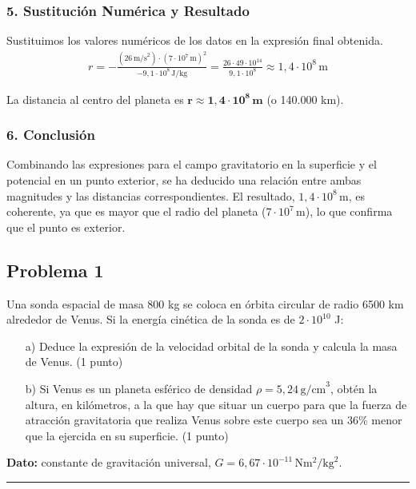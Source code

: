 \subsubsection*{5. Sustitución Numérica y Resultado}
Sustituimos los valores numéricos de los datos en la expresión final obtenida.
\begin{gather}
    r = -\frac{(26\,\text{m/s}^2) \cdot (7 \cdot 10^7\,\text{m})^2}{-9,1 \cdot 10^8\,\text{J/kg}} = \frac{26 \cdot 49 \cdot 10^{14}}{9,1 \cdot 10^8} \approx 1,4 \cdot 10^8 \, \text{m}
\end{gather}
\begin{cajaresultado}
    La distancia al centro del planeta es $\boldsymbol{r \approx 1,4 \cdot 10^8 \, \textbf{m}}$ (o 140.000 km).
\end{cajaresultado}

\subsubsection*{6. Conclusión}
\begin{cajaconclusion}
Combinando las expresiones para el campo gravitatorio en la superficie y el potencial en un punto exterior, se ha deducido una relación entre ambas magnitudes y las distancias correspondientes. El resultado, $1,4 \cdot 10^8\,\text{m}$, es coherente, ya que es mayor que el radio del planeta ($7 \cdot 10^7\,\text{m}$), lo que confirma que el punto es exterior.
\end{cajaconclusion}

\newpage

\subsection{Problema 1}
\label{subsec:P1_2022_jul_ord}

\begin{cajaenunciado}
Una sonda espacial de masa 800 kg se coloca en órbita circular de radio 6500 km alrededor de Venus. Si la energía cinética de la sonda es de $2\cdot10^{10}$ J:
\begin{enumerate}
    \item[a)] Deduce la expresión de la velocidad orbital de la sonda y calcula la masa de Venus. (1 punto)
    \item[b)] Si Venus es un planeta esférico de densidad $\rho=5,24\,\text{g/cm}^3$, obtén la altura, en kilómetros, a la que hay que situar un cuerpo para que la fuerza de atracción gravitatoria que realiza Venus sobre este cuerpo sea un 36\% menor que la ejercida en su superficie. (1 punto)
\end{enumerate}
\textbf{Dato:} constante de gravitación universal, $G=6,67\cdot10^{-11}\,\text{N}\text{m}^2/\text{kg}^2$.
\end{cajaenunciado}
\hrule

